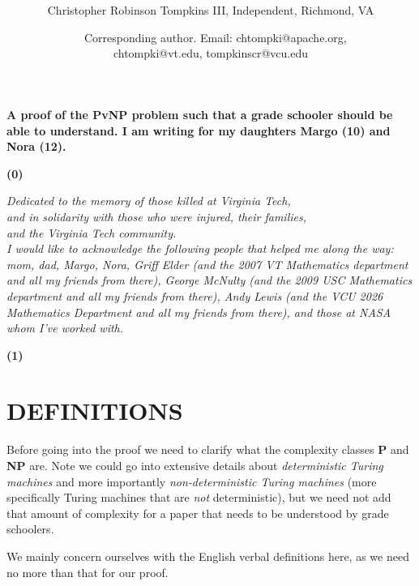 \documentclass[11pt]{article}
\date{}
\title{\bfseries \boldmath \scititle}
\author{
    Christopher Robinson Tompkins III, Independent, Richmond, VA\and\
%
    Corresponding author. Email: chtompki@apache.org,\\ chtompki@vt.edu, tompkinscr@vcu.edu
}
\renewenvironment{abstract}
{\quotation}
{\endquotation}
\begin{document}
    \maketitle

    \begin{abstract} \bfseries \boldmath
        A proof of the PvNP problem such that a grade schooler should be able to understand. I am
        writing for my daughters Margo (10) and Nora (12).
    \end{abstract}


    \textbf{(0)}
    \begin{center}
        \emph{Dedicated to the memory of those killed at Virginia Tech,\\
        and in solidarity with those who were injured, their families,\\
        and the Virginia Tech community.}
        \qquad\\
        \emph{I would like to acknowledge the following people that helped me along the way: mom, dad, Margo, Nora,
            Griff Elder (and the 2007 VT Mathematics department and all my friends from there), George McNulty (and the 2009 USC Mathematics department and all my friends from there),
            Andy Lewis (and the VCU 2026 Mathematics Department and all my friends from there), and those at NASA whom I've worked with.}
    \end{center}

    \newpage
    \textbf{(1)}
    \section*{DEFINITIONS}

    Before going into the proof we need to clarify what the complexity classes \textbf{P} and \textbf{NP} are.
    Note we could go into extensive details about \emph{deterministic Turing machines} and more importantly
    \emph{non-deterministic Turing machines} (more specifically Turing machines that are \emph{not} deterministic),
    but we need not add that amount of complexity for a paper that needs to be understood by grade schoolers.

    We mainly concern ourselves with the English verbal definitions here, as we need no more than that for our proof.
\end{document}
